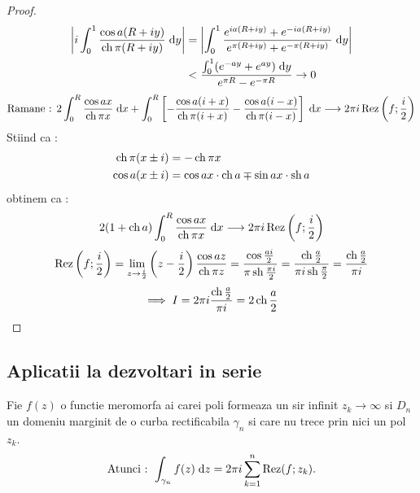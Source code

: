 \begin{aplicatie}
\begin{proof}
            \begin{align*}
              \left| i \int_{0}^{1} \frac{\cos a (R+iy)}{\operatorname{ch} \pi (R+iy)} \; \mathrm{d} y \right|
                 &= \left| \int_{0}^{1} \frac{e^{ia(R+iy)} + e^{-ia(R+iy)}}
                                           {e^{\pi(R+iy)} + e^{-\pi(R+iy)}} \; \mathrm{d} y \right|
              \\ &< \frac{\int_{0}^{1} (e^{-ay} + e^{ay}) \; \mathrm{d} y}{e^{\pi R} - e^{-\pi R}}
                \to 0
            \end{align*}
            \[
                \text{Ramane : } 2 \int_{0}^{R} \frac{\cos ax}{\operatorname{ch} \pi x} \; \mathrm{d} x
                    + \int_{0}^{R} \left[
                                    - \frac{\cos a(i+x)}{\operatorname{ch} \pi (i+x)}
                                    - \frac{\cos a(i-x)}{\operatorname{ch} \pi (i-x)}
                                   \right] \; \mathrm{d} x
                \longrightarrow 2 \pi i \operatorname{Rez} \left(f;\frac{i}{2}\right)
            \]
            Stiind ca :
            \begin{align*}
                \operatorname{ch} \pi( x \pm i) &= -\operatorname{ch} \pi x
                \\
                \cos a(x \pm i) &= \cos ax \cdot \operatorname{ch} a \mp \sin ax \cdot \operatorname{sh} a
            \end{align*}
            obtinem ca :
            \[
                2(1+\operatorname{ch} a) \int_{0}^{R} \frac{\cos ax}{\operatorname{ch} \pi x} \; \mathrm{d} x
                    \longrightarrow 2 \pi i \operatorname{Rez} \left(f;\frac{i}{2}\right)
            \]
            \[
                \operatorname{Rez} \left(f;\frac{i}{2} \right)
                    = \lim_{z\to\frac{i}{2}} \left( z- \frac{i}{2}\right) \frac{\cos az}{\operatorname{ch} \pi z}
                    = \frac{\cos \frac{ai}{2}}{\pi \operatorname{sh} \frac{\pi i}{2}}
                    = \frac{\operatorname{ch} \frac{a}{2}}{\pi i \operatorname{sh} \frac{\pi}{2}}
                    = \frac{\operatorname{ch} \frac{a}{2}}{\pi i}
            \]
            \[
                \implies I = 2 \pi i \frac{\operatorname{ch} \frac{a}{2}}{\pi i} = 2 \operatorname{ch} \frac{a}{2}
            \]
        \end{proof}

    \end{aplicatie}

    \subsection{Aplicatii la dezvoltari in serie}

    \begin{theorem}
        Fie $f(z)$ o functie meromorfa ai carei poli formeaza un sir infinit $z_k \to \infty$
        si $D_n$ un domeniu marginit de o curba rectificabila $\gamma_n$ si care nu trece
        prin nici un pol $z_k$.
        \[
            \text{Atunci : } \int_{\gamma_n} f(z) \; \mathrm{d} z = 2\pi i \sum_{k=1}^{n} \operatorname{Rez} (f;z_k) .
        \]
    \end{theorem}

